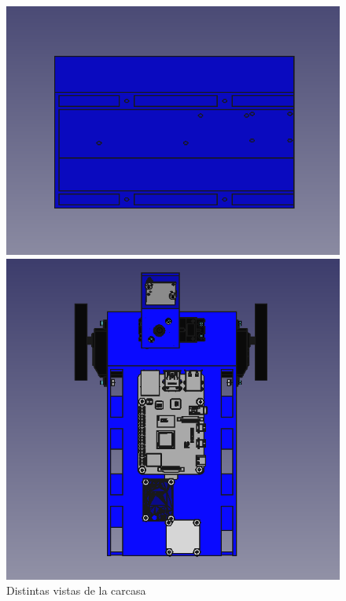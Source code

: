\begin{figure}[ht!]
	\centering
	\begin{minipage}{0.45\linewidth}
		\centering
		\includegraphics[width=\linewidth]{figs/cap5/superior2.png}
		\caption*{\centering} %
	\end{minipage}
	\hspace{1cm}
	\begin{minipage}{0.45\linewidth}
		\centering
		\includegraphics[width=\linewidth]{figs/cap5/superior1m.png}
		\caption*{\centering}
	\end{minipage}
	\caption{Distintas vistas de la carcasa}
	\label{fig:psuperior}
\end{figure}


